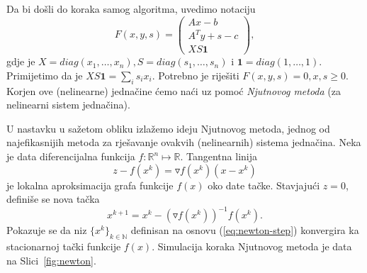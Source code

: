 \documentclass[b5paper, utf8, 11pt, colorlinks]{book}
\theoremstyle{definition}
\begin{document}
Da bi došli do koraka samog algoritma, uvedimo notaciju 
$$ F(x, y, s) = \left (\begin{array}{c}
	Ax - b           \\
	A^T y + s - c     \\
	X S \textbf{1}                   
\end{array} \right ),$$
gdje je  $X = diag (x_1, \ldots, x_n ), S = diag(s_1,\ldots, s_n)$ i 
$\textbf{1} = diag (1,\ldots, 1)$. Primijetimo da  je $X S \textbf{1}=\sum_{i} s_i x_i$. 
Potrebno je riješiti $F(x, y, s ) = 0, x,s \geq 0$. Korjen ove (nelinearne) jednačine ćemo naći uz pomoć \emph{Njutnovog metoda} (za nelinearni sistem jednačina).  %

U nastavku u sažetom obliku izlažemo ideju Njutnovog metoda, jednog od najefikasnijih metoda za rješavanje ovakvih (nelinearnih) sistema jednačina. Neka je data diferencijalna funkcija $f: \mathbb{R}^n \mapsto \mathbb{R}$.   Tangentna linija 
$$z - f(x^k) = \triangledown f(x^k) (x - x^k) $$
je lokalna aproksimacija grafa funkcije $f(x)$ oko date tačke. Stavjajući $z=0$, definiše se nova tačka 
\begin{equation} \label{eq:newton-step}
	x^{k+1} = x^k - (\triangledown f(x^k))^{-1} f(x^k).
\end{equation}
Pokazuje se da niz $\{x^k\}_{k \in \mathbb{N}}$ definisan na osnovu (\ref{eq:newton-step}) konvergira ka stacionarnoj tački funkcije $f(x)$. Simulacija koraka Njutnovog metoda je data na Slici~\ref{fig:newton}. 
\end{document}
